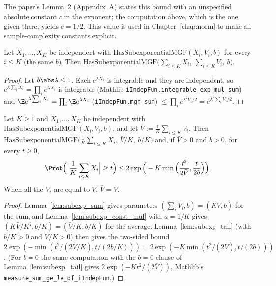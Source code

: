 \begin{remark}\label{rem:ps_tail_constant}
The paper's Lemma~2 (Appendix~A) states this bound with an unspecified absolute constant $c$
in the exponent; the computation above, which is the one given there, yields $c = 1/2$. This
value is used in Chapter~\ref{chap:norm} to make all sample-complexity constants explicit.
\end{remark}

\begin{lemma}\label{lem:subexp_sum}
\leanok
{}
Let $X_1,\dots,X_K$ be independent with $\mathrm{HasSubexponentialMGF}(X_i,V_i,b)$ for every
$i \le K$ (the same $b$). Then $\mathrm{HasSubexponentialMGF}\big(\sum_{i\le K}X_i,\ \sum_{i\le K}V_i,\ b\big)$.
\end{lemma}

\begin{proof}
\leanok
{}
Let $b\abs\lambda \le 1$. Each $e^{\lambda X_i}$ is integrable and they are independent, so
$e^{\lambda\sum_iX_i} = \prod_ie^{\lambda X_i}$ is integrable (Mathlib
\texttt{iIndepFun.integrable\_exp\_mul\_sum}) and
$\E e^{\lambda\sum_iX_i} = \prod_i\E e^{\lambda X_i}$ (\texttt{iIndepFun.mgf\_sum})
$\le \prod_ie^{\lambda^2V_i/2} = e^{\lambda^2\sum_iV_i/2}$.
\end{proof}

\begin{corollary}\label{cor:subexp_average_tail}
\leanok
{}
Let $K \ge 1$ and $X_1,\dots,X_K$ be independent with $\mathrm{HasSubexponentialMGF}(X_i,V_i,b)$,
and let $\bar V := \frac1K\sum_{i\le K}V_i$. Then
$\mathrm{HasSubexponentialMGF}\big(\frac1K\sum_{i\le K}X_i,\ \bar V/K,\ b/K\big)$ and, if
$\bar V > 0$ and $b > 0$, for every $t \ge 0$,
\[
  \Prob\Big(\Big|\frac1K\sum_{i\le K}X_i\Big| \ge t\Big)
  \le 2\exp\Big(-K\min\Big(\frac{t^2}{2\bar V}, \frac{t}{2b}\Big)\Big).
\]
When all the $V_i$ are equal to $V$, $\bar V = V$.
\end{corollary}

\begin{proof}
\leanok
{}
Lemma~\ref{lem:subexp_sum} gives parameters $(\sum_iV_i, b) = (K\bar V, b)$ for the sum, and
Lemma~\ref{lem:subexp_const_mul} with $a = 1/K$ gives $(K\bar V/K^2, b/K) = (\bar V/K, b/K)$ for
the average. Lemma~\ref{lem:subexp_tail} (with $b/K > 0$ and $\bar V/K > 0$) then gives the
two-sided bound
$2\exp(-\min(t^2/(2\bar V/K), t/(2b/K))) = 2\exp(-K\min(t^2/(2\bar V), t/(2b)))$.
(For $b = 0$ the same computation with the $b = 0$ clause of Lemma~\ref{lem:subexp_tail} gives
$2\exp(-Kt^2/(2\bar V))$, Mathlib's \texttt{measure\_sum\_ge\_le\_of\_iIndepFun}.)
\end{proof}

